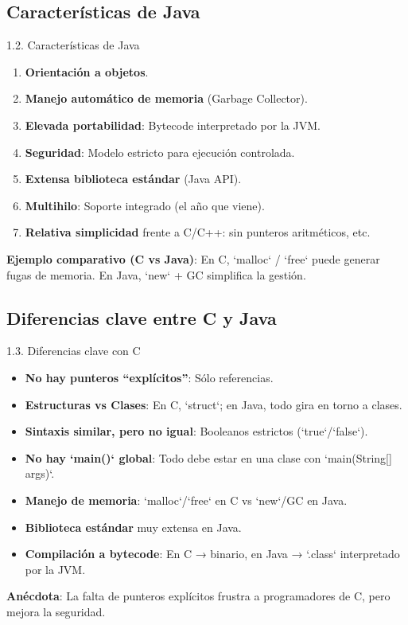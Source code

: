 \documentclass{beamer}
\begin{document}
\subsection{Características de Java}

\begin{frame}{1.2. Características de Java}
\begin{enumerate}
  \item \textbf{Orientación a objetos}.
  \item \textbf{Manejo automático de memoria} (Garbage Collector).
  \item \textbf{Elevada portabilidad}: Bytecode interpretado por la JVM.
  \item \textbf{Seguridad}: Modelo estricto para ejecución controlada.
  \item \textbf{Extensa biblioteca estándar} (Java API).
  \item \textbf{Multihilo}: Soporte integrado (el año que viene).
  \item \textbf{Relativa simplicidad} frente a C/C++: sin punteros aritméticos, etc.
\end{enumerate}

\textbf{Ejemplo comparativo (C vs Java)}:  
En C, `malloc` / `free` puede generar fugas de memoria. En Java, `new` + GC simplifica la gestión.
\end{frame}

\subsection{Diferencias clave entre C y Java}

\begin{frame}{1.3. Diferencias clave con C}
\begin{itemize}
  \item \textbf{No hay punteros “explícitos”}: Sólo referencias.
  \item \textbf{Estructuras vs Clases}: En C, `struct`; en Java, todo gira en torno a clases.
  \item \textbf{Sintaxis similar, pero no igual}: Booleanos estrictos (`true`/`false`).
  \item \textbf{No hay `main()` global}: Todo debe estar en una clase con `main(String[] args)`.
  \item \textbf{Manejo de memoria}: `malloc`/`free` en C vs `new`/GC en Java.
  \item \textbf{Biblioteca estándar} muy extensa en Java.
  \item \textbf{Compilación a bytecode}: En C → binario, en Java → `.class` interpretado por la JVM.
\end{itemize}

\textbf{Anécdota}:  
La falta de punteros explícitos frustra a programadores de C, pero mejora la seguridad.
\end{frame}
\end{document}
